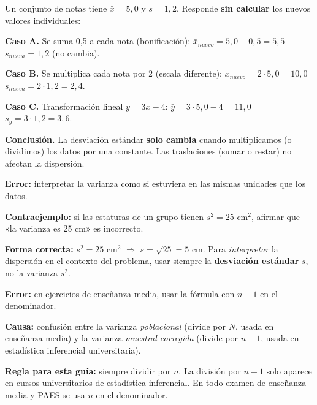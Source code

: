 \documentclass[11pt, letterpaper]{article}
\begin{document}
\begin{tcolorbox}[examplebox, title={Ej. 13. Propiedades de transformación}]
Un conjunto de notas tiene $\bar{x} = 5{,}0$ y $s = 1{,}2$. Responde \textbf{sin calcular} los nuevos valores individuales:

\noindent\textbf{Caso A.} Se suma 0{,}5 a cada nota (bonificación): \quad $\bar{x}_{nuevo} = 5{,}0 + 0{,}5 = 5{,}5$ \quad $s_{nueva} = 1{,}2$ (no cambia).
\medskip

\noindent\textbf{Caso B.} Se multiplica cada nota por 2 (escala diferente): \quad $\bar{x}_{nuevo} = 2 \cdot 5{,}0 = 10{,}0$ \quad $s_{nueva} = 2 \cdot 1{,}2 = 2{,}4$.
\medskip

\noindent\textbf{Caso C.} Transformación lineal $y = 3x - 4$: \quad $\bar{y} = 3 \cdot 5{,}0 - 4 = 11{,}0$ \quad $s_y = 3 \cdot 1{,}2 = 3{,}6$.
\medskip

\noindent\textbf{Conclusión.} La desviación estándar \textbf{solo cambia} cuando multiplicamos (o dividimos) los datos por una constante. Las traslaciones (sumar o restar) no afectan la dispersión.

\end{tcolorbox}

\begin{tcolorbox}[warningbox, title={Error frecuente: confundir varianza con desviación estándar}]
\textbf{Error:} interpretar la varianza como si estuviera en las mismas unidades que los datos.

\medskip

\textbf{Contraejemplo:} si las estaturas de un grupo tienen $s^2 = 25$ cm$^2$, afirmar que «la varianza es 25 cm» es incorrecto.

\medskip

\textbf{Forma correcta:} $s^2 = 25$ cm$^2$ $\Rightarrow$ $s = \sqrt{25} = 5$ cm. Para \textit{interpretar} la dispersión en el contexto del problema, usar siempre la \textbf{desviación estándar} $s$, no la varianza $s^2$.
\end{tcolorbox}

\begin{tcolorbox}[warningbox, title={Error frecuente: dividir por $n-1$ en lugar de $n$}]
\textbf{Error:} en ejercicios de enseñanza media, usar la fórmula con $n-1$ en el denominador.

\medskip

\textbf{Causa:} confusión entre la varianza \textit{poblacional} (divide por $N$, usada en enseñanza media) y la varianza \textit{muestral corregida} (divide por $n-1$, usada en estadística inferencial universitaria).

\medskip

\textbf{Regla para esta guía:} siempre dividir por $n$. La división por $n-1$ solo aparece en cursos universitarios de estadística inferencial. En todo examen de enseñanza media y PAES se usa $n$ en el denominador.
\end{tcolorbox}
\end{document}
